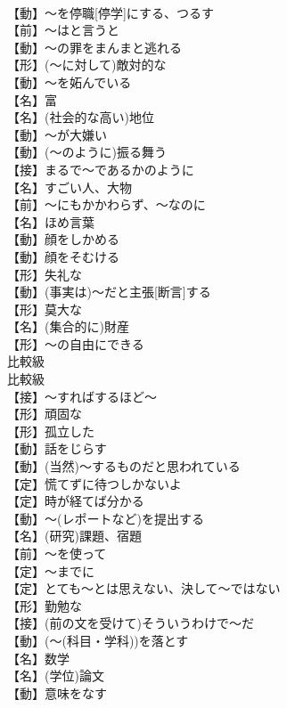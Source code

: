 \documentclass[8pt]{extreport}
\begin{document}
\begin{CJK}{UTF8}{min}
\\	【動】～を停職[停学]にする、つるす
\\	【前】～はと言うと
\\	【動】～の罪をまんまと逃れる
\\	【形】(～に対して)敵対的な
\\	【動】～を妬んでいる
\\	【名】富
\\	【名】(社会的な高い)地位
\\	【動】～が大嫌い
\\	【動】(～のように)振る舞う
\\	【接】まるで～であるかのように
\\	【名】すごい人、大物
\\	【前】～にもかかわらず、～なのに
\\	【名】ほめ言葉
\\	【動】顔をしかめる
\\	【動】顔をそむける
\\	【形】失礼な
\\	【動】(事実は)～だと主張[断言]する
\\	【形】莫大な
\\	【名】(集合的に)財産
\\	【形】～の自由にできる
\\	比較級 
\\	比較級 
\\	【接】～すればするほど～
\\	【形】頑固な
\\	【形】孤立した
\\	【動】話をじらす
\\	【動】(当然)～するものだと思われている
\\	【定】慌てずに待つしかないよ
\\	【定】時が経てば分かる
\\	【動】～(レポートなど)を提出する
\\	【名】(研究)課題、宿題
\\	【前】～を使って
\\	【定】～までに
\\	【定】とても～とは思えない、決して～ではない
\\	【形】勤勉な
\\	【接】(前の文を受けて)そういうわけで～だ
\\	【動】(～(科目・学科))を落とす
\\	【名】数学
\\	【名】(学位)論文
\\	【動】意味をなす

\end{CJK}
\end{document}
